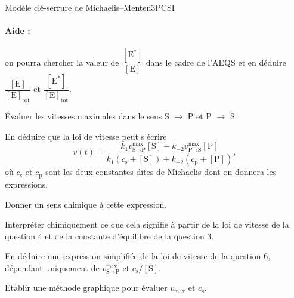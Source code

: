 \begin{exercise}{Modèle clé-serrure de Michaelis--Menten}{3}{PCSI}
\begin{questions}
\paragraph{Aide :} on pourra chercher la valeur de $\dfrac{[\text{E}^\ast]}{[\text{E}]}$ dans le cadre de l'AEQS et en déduire $\dfrac{[\text{E}]}{[\text{E}]_\text{tot}}$ et  $\dfrac{[\text{E}^\ast]}{[\text{E}]_\text{tot}}$.

\question \'Evaluer les vitesses maximales dans le sens S $\rightarrow$ P et P $\rightarrow$ S.

\question En déduire que la loi de vitesse peut s'écrire
$$v(t) = \dfrac{k_1 v^\text{max}_{\text{S} \rightarrow \text{P}}[\text{S}] - k_{-2} v^\text{max}_{\text{P} \rightarrow \text{S}}[\text{P}]}{k_1(c_\text{s} + [\text{S}]) + k_{-2}(c_\text{p} + [\text{P}])},$$
où $c_\text{s}$ et $c_\text{p}$ sont les deux constantes dites de Michaelis dont on donnera les expressions.

Donner un sens chimique à cette expression.


\question Interpréter chimiquement ce que cela signifie à partir de la loi de vitesse de la question 4 et de la constante d'équilibre de la question 3.

\question En déduire une expression simplifiée de la loi de vitesse de la question 6, dépendant uniquement de $v^\text{max}_{\text{S} \rightarrow \text{P}}$ et $c_\text{s}/[\text{S}]$.

\question Etablir une méthode graphique pour évaluer $v_\text{max}$ et $c_\text{s}$.

\end{questions}

\end{exercise}